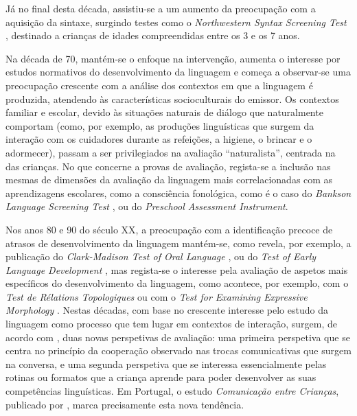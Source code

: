 \documentclass[output=paper]{LSP/langsci}
\begin{document}
Já no final desta década, assistiu-se a um aumento da preocupação com a aquisição da sintaxe, surgindo testes como o \textit{Northwestern Syntax Screening Test} \citep{lee1969}, destinado a crianças de idades compreendidas entre os 3 e os 7 anos. 

Na década de 70, mantém-se o enfoque na intervenção, aumenta o interesse por estudos normativos do desenvolvimento da linguagem e começa a observar-se uma preocupação crescente com a análise dos contextos em que a linguagem é produzida, atendendo às características socioculturais do emissor. Os contextos familiar e escolar, devido às situações naturais de diálogo que naturalmente comportam (como, por exemplo, as produções linguísticas que surgem da interação com os cuidadores durante as refeições, a higiene, o brincar e o adormecer), passam a ser privilegiados na avaliação “naturalista”, centrada na  das crianças. No que concerne a provas de avaliação, regista-se a inclusão nas mesmas de dimensões da avaliação da linguagem mais correlacionadas com as aprendizagens escolares, como a consciência fonológica, como é o caso do \textit{Bankson Language Screening Test} \citep{bankson1977}, ou do \textit{Preschool Assessment Instrument}\citep{blank_etal1978}.

Nos anos 80 e 90 do século XX, a preocupação com a identificação precoce de atrasos de desenvolvimento da linguagem mantém-se, como revela, por exemplo, a publicação do\textit{ Clark-Madison Test of Oral Language} \citep{clarkmadison1981}, ou do \textit{Test of Early Language Development} \citep{hresko_etal1981}, mas regista-se o interesse pela avaliação de aspetos mais específicos do desenvolvimento da linguagem, como acontece, por exemplo, com o \textit{Test de Rélations Topologiques} \citep{deiltourhupkens1980} ou com o \textit{Test for Examining Expressive Morphology} \citep{shipley_etal1983}. Nestas décadas, com base no crescente interesse pelo estudo da linguagem como processo que tem lugar em contextos de interação, surgem, de acordo com \citet{acosta2006}, duas novas perspetivas de avaliação: uma primeira perspetiva que se centra no princípio da cooperação observado nas trocas comunicativas que surgem na conversa, e uma segunda perspetiva que se interessa essencialmente pelas rotinas ou formatos que a criança aprende para poder desenvolver as suas competências linguísticas. Em Portugal, o estudo \textit{Comunicação entre Crianças}, publicado por \citet{simoes1990}, marca precisamente esta nova tendência. 
\end{document}

